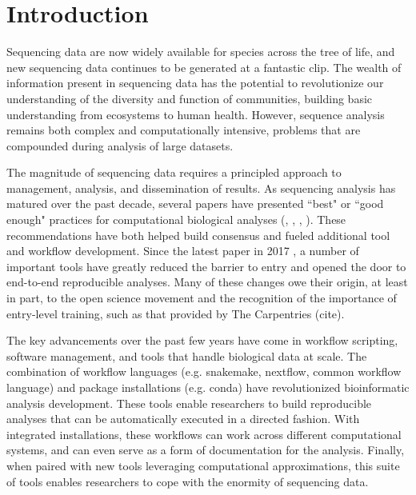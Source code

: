 \documentclass[10pt,letterpaper]{article}
\begin{document}
\linenumbers

\section*{Introduction}

Sequencing data are now widely available for species across the tree of life, and new sequencing data continues to be generated at a fantastic clip. %
The wealth of information present in sequencing data has the potential to revolutionize our understanding of the diversity and function of communities, building basic understanding from ecosystems to human health.
However, sequence analysis remains both complex and computationally intensive, problems that are compounded during analysis of large datasets.

The magnitude of sequencing data requires a principled approach to management, analysis, and dissemination of results.
As sequencing analysis has matured over the past decade, several papers have presented ``best" or ``good enough" practices for computational biological analyses (\cite{aruliah2012best}, \cite{wilson2014best}, \cite{shade2015roadmap}, \cite{wilson2017good}).
These recommendations have both helped build consensus and fueled additional tool and workflow development.
Since the latest paper in 2017 \cite{wilson2017good}, a number of important tools have greatly reduced the barrier to entry and opened the door to end-to-end reproducible analyses. %
Many of these changes owe their origin, at least in part, to the open science movement and the recognition of the importance of entry-level training, such as that provided by The Carpentries (cite).

The key advancements over the past few years have come in workflow scripting, software management, and tools that handle biological data at scale. %
The combination of workflow languages (e.g. snakemake, nextflow, common workflow language) and package installations (e.g. conda) have revolutionized bioinformatic analysis development.
These tools enable researchers to build reproducible analyses that can be automatically executed in a directed fashion. 
With integrated installations, these workflows can work across different computational systems, and can even serve as a form of documentation for the analysis.
Finally, when paired with new tools leveraging computational approximations, this suite of tools enables researchers to cope with the enormity of sequencing data.
\end{document}
